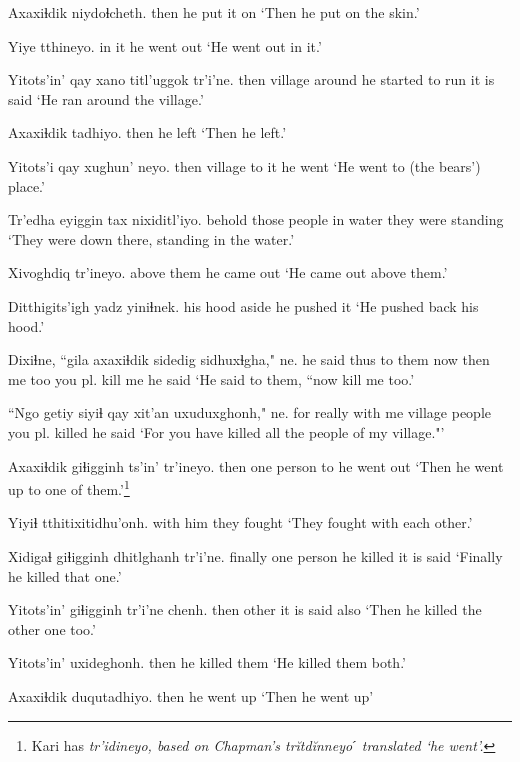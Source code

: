 \documentclass[12pt]{article}
\begin{document}
\gll Axaxiɬdik niydoɬcheth.
then  {he put it on}
\glt `Then he put on the skin.'
\glend

\gll Yiye tthineyo.
{in it} {he went out}
\glt `He went out in it.'
\glend

\gll Yitots'in' qay xano titl'uggok tr'i'ne.
then  village around {he started to run}  {it is said}
\glt `He ran around the village.'
\glend

\gll Axaxiɬdik tadhiyo.
then  {he left}
\glt `Then he left.'
\glend

\gll Yitots'i qay xughun' neyo.
then  village {to it} {he went}
\glt `He went to (the bears') place.'
\glend

\gll Tr'edha eyiggin tax   nixiditl'iyo.
behold  {those people} {in water} {they were standing}
\glt `They were down there, standing in the water.'
\glend

\gll Xivoghdiq tr'ineyo.
{above them} {he came out}
\glt `He came out above them.'
\glend

\gll Ditthigits'igh yadz yiniɬnek.
{his hood} aside {he pushed it}
\glt `He pushed back his hood.'
\glend

\gll Dixiɬne,  ``gila axaxiɬdik sidedig sidhuxɬgha," ne.
{he said thus to them} now then  {me too} {you pl. kill me} {he said}
\glt `He said to them, ``now kill me too.'
\glend

\gll ``Ngo getiy siyiɬ  qay  xit'an uxuduxghonh," ne.
for really {with me} village  people {you pl. killed} {he said}
\glt `For you have killed all the people of my village."'
\glend

\gll Axaxiɬdik giɬigginh ts'in' tr'ineyo.
then {one person} to {he went out}
\glt `Then he went up to one of them.'\footnote{Kari has \em tr'idineyo, \em based on Chapman's \em tr\u{i}td\u{i}nneyoˊ \em translated `he went'.}
\glend

\gll Yiyiɬ tthitixitidhu'onh.
{with him} {they fought }
\glt `They fought with each other.'
\glend

\gll Xidigaɬ giɬigginh dhitlghanh tr'i'ne.
finally  {one person} {he killed} {it is said}
\glt `Finally he killed that one.'
\glend

\gll Yitots'in' giɬigginh tr'i'ne chenh.
then  other  {it is said} also
\glt `Then he killed the other one too.'
\glend

\gll Yitots'in' uxideghonh.
then  {he killed them}
\glt `He killed them both.'
\glend

\gll Axaxiɬdik duqutadhiyo.
then  {he went up}
\glt `Then he went up'
\glend
\end{document}
